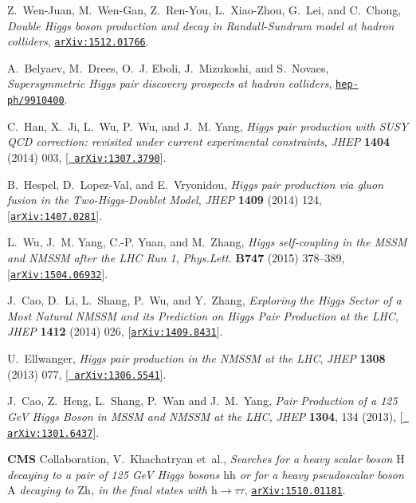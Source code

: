 \documentclass[a4paper,11pt]{article}
\begin{document}
\begin{thebibliography}{100}
Z.~Wen-Juan, M.~Wen-Gan, Z.~Ren-You, L.~Xiao-Zhou, G.~Lei, and C.~Chong, {\it
  {Double Higgs boson production and decay in Randall-Sundrum model at hadron
  colliders}},  \href{http://arxiv.org/abs/1512.01766}{{\tt arXiv:1512.01766}}.

A.~Belyaev, M.~Drees, O.~J. Eboli, J.~Mizukoshi, and S.~Novaes, {\it
  {Supersymmetric Higgs pair discovery prospects at hadron colliders}},
  \href{http://arxiv.org/abs/hep-ph/9910400}{{\tt hep-ph/9910400}}.

C.~Han, X.~Ji, L.~Wu, P.~Wu, and J.~M. Yang, {\it {Higgs pair production with
  SUSY QCD correction: revisited under current experimental constraints}},
  {\em JHEP} {\bf 1404} (2014) 003, [\href{http://arxiv.org/abs/1307.3790}{{\tt
  arXiv:1307.3790}}].

B.~Hespel, D.~Lopez-Val, and E.~Vryonidou, {\it {Higgs pair production via
  gluon fusion in the Two-Higgs-Doublet Model}},  {\em JHEP} {\bf 1409} (2014)
  124, [\href{http://arxiv.org/abs/1407.0281}{{\tt arXiv:1407.0281}}].

L.~Wu, J.~M. Yang, C.-P. Yuan, and M.~Zhang, {\it {Higgs self-coupling in the
  MSSM and NMSSM after the LHC Run 1}},  {\em Phys.Lett.} {\bf B747} (2015)
  378--389, [\href{http://arxiv.org/abs/1504.06932}{{\tt arXiv:1504.06932}}].

J.~Cao, D.~Li, L.~Shang, P.~Wu, and Y.~Zhang, {\it Exploring the Higgs Sector
  of a Most Natural NMSSM and its Prediction on Higgs Pair Production at the
  LHC},  {\em JHEP} {\bf 1412} (2014) 026,
  [\href{http://arxiv.org/abs/1409.8431}{{\tt arXiv:1409.8431}}].

U.~Ellwanger, {\it {Higgs pair production in the NMSSM at the LHC}},  {\em
  JHEP} {\bf 1308} (2013) 077, [\href{http://arxiv.org/abs/1306.5541}{{\tt
  arXiv:1306.5541}}].

  J.~Cao, Z.~Heng, L.~Shang, P.~Wan and J.~M.~Yang,
  {\it Pair Production of a 125 GeV Higgs Boson in MSSM and NMSSM at the LHC,}
  {\em JHEP} {\bf 1304}, 134 (2013),
  [\href{http://arxiv.org/abs/1301.6437}{{\tt
  arXiv:1301.6437}}].

{\bf CMS} Collaboration, V.~Khachatryan et~al., {\it {Searches for a heavy
  scalar boson $ \mathrm{H} $ decaying to a pair of 125 GeV Higgs bosons $
  \mathrm{ hh } $ or for a heavy pseudoscalar boson $ \mathrm{A} $ decaying to
  $ \mathrm{Zh} $, in the final states with $\mathrm{h} \to \tau \tau$}},
  \href{http://arxiv.org/abs/1510.01181}{{\tt arXiv:1510.01181}}.


\end{thebibliography}
\end{document}
